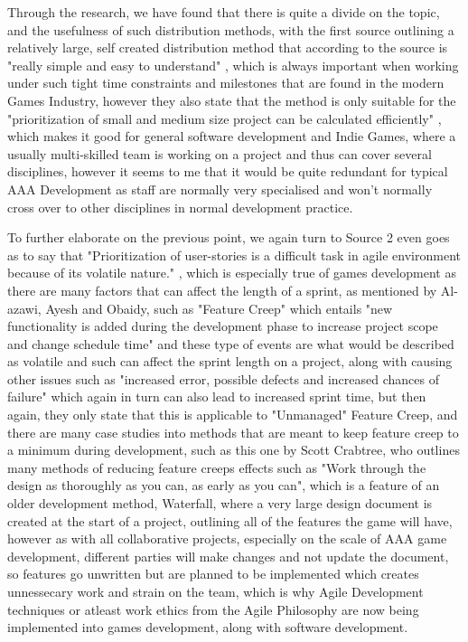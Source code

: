 \documentclass{scrartcl}
\begin{document}
Through the research, we have found that there is quite a divide on the topic, and the usefulness of such distribution methods, with the first source outlining a relatively large, self created distribution method that according to the source is "really simple and easy to understand" \cite[p. 5]{popli2014prioritising}, which is always important when working under such tight time constraints and milestones that are found in the modern Games Industry, however they also state that the method is only suitable for the "prioritization of small and medium size project can be calculated efficiently" \cite[p. 5]{popli2014prioritising}, which makes it good for general software development and Indie Games, where a usually multi-skilled team is working on a project and thus can cover several disciplines, however it seems to me that it would be quite redundant for typical AAA Development as staff are normally very specialised and won't normally cross over to other disciplines in normal development practice.


To further elaborate on the previous point, we again turn to Source 2 even goes as to say that "Prioritization of user-stories is a difficult task in agile environment because of its volatile nature." \cite[p. 1]{popli2014prioritising}, which is especially true of games development as there are many factors that can affect the length of a sprint, as mentioned by Al-azawi, Ayesh and Obaidy, such as "Feature Creep" \cite[p. 3]{al2014towards} which entails "new functionality is added during the development phase to increase project scope and change schedule time" \cite[p. 3]{al2014towards} and these type of events are what would be described as volatile and such can affect the sprint length on a project, along with causing other issues such as "increased error, possible defects and increased chances of failure" \cite[p. 3]{al2014towards} which again in turn can also lead to increased sprint time, but then again, they only state that this is applicable to "Unmanaged" \cite[p. 3]{al2014towards} Feature Creep, and there are many case studies into methods that are meant to keep feature creep to a minimum during development, such as this one by Scott Crabtree, who outlines many methods of reducing feature creeps effects such as "Work through the design as thoroughly as you can, as early as you can"\cite[p. 2]{featurecreep}, which is a feature of an older development method, Waterfall, where a very large design document is created at the start of a project, outlining all of the features the game will have, however as with all collaborative projects, especially on the scale of AAA game development, different parties will make changes and not update the document, so features go unwritten but are planned to be implemented which creates unnessecary work and strain on the team, which is why Agile Development techniques or atleast work ethics from the Agile Philosophy are now being implemented into games development, along with software development.
\end{document}
